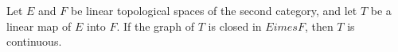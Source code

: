 Let $E$ and $F$ be linear topological spaces of the second category, and let $T$ be a linear map of $E$ into $F$. If the graph of $T$ is closed in $E 	imes F$, then $T$ is continuous.
